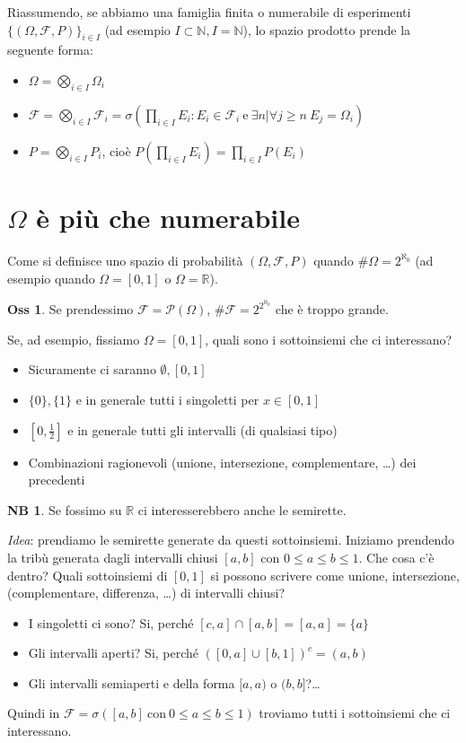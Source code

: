 \documentclass[12pt, a4paper]{report}
\theoremstyle{definition}
\newtheorem*{observation}{Oss}
\newtheorem*{note}{NB}
\DeclareRobustCommand{\F}{\mathcal{F}}%
\DeclareRobustCommand{\R}{\mathbb{R}}%
\DeclareRobustCommand{\N}{\mathbb{N}}%
\DeclareRobustCommand{\powerset}{\mathcal{P}(\Omega)}
\DeclareRobustCommand{\probspace}{(\Omega,\F,P)}
\begin{document}
Riassumendo, se abbiamo una famiglia finita o numerabile di esperimenti \(\{
\probspace\}_{i\in I}\) (ad esempio \(I\subset\N, I=\N\)), lo
spazio prodotto prende la seguente forma:
\begin{itemize}
	\item \(\Omega=\bigotimes_{i\in I}\Omega_i\)
	\item \(\F=\bigotimes_{i\in I}\F_i=\sigma(\prod_{i\in I}E_i:E_i\in\F_i\ 
	\text{e}\ \exists n|\forall j\geq n\ E_j=\Omega_i)\)
	\item \(P=\bigotimes_{i\in I}P_i\), cioè \(P(\prod_{i\in I}E_i)=
	\prod_{i\in I}P(E_i)\)
\end{itemize}
\section{$\Omega$ è più che numerabile}
Come si definisce uno spazio di probabilità $\probspace$ quando \(\#\Omega=
2^{\aleph_0}\) (ad esempio quando \(\Omega=[0,1]\) o \(\Omega=\R\)).

\begin{observation}
	Se prendessimo $\F=\powerset$, $\#\F=2^{2^{\aleph_0}}$ che è troppo grande.
\end{observation}

Se, ad esempio, fissiamo \(\Omega=[0,1]\), quali sono i sottoinsiemi che ci interessano?
\begin{itemize}
	\item Sicuramente ci saranno \(\emptyset, [0,1]\)
	\item \(\{0\}, \{1\}\) e in generale tutti i singoletti per \(x\in [0,1]\)
	\item \([0, \frac{1}{2}]\) e in generale tutti gli intervalli (di qualsiasi tipo)
	\item Combinazioni ragionevoli (unione, intersezione, complementare, \dots) dei
	precedenti
\end{itemize}
\begin{note}
	Se fossimo su $\R$ ci interesserebbero anche le semirette.
\end{note}

\emph{Idea}: prendiamo le semirette generate da questi sottoinsiemi.
Iniziamo prendendo la tribù generata dagli intervalli chiusi $[a,b]$ con
\(0\leq a\leq b\leq 1\). Che cosa c'è dentro? Quali sottoinsiemi di $[0,1]$ si
possono scrivere come unione, intersezione, (complementare, differenza, \dots) di
intervalli chiusi?
\begin{itemize}
	\item I singoletti ci sono? Si, perché \([c,a]\cap [a,b]=[a,a]=\{a\}\)
	\item Gli intervalli aperti? Si, perché \(([0,a]\cup[b,1])^c=(a,b)\)
	\item Gli intervalli semiaperti e della forma $[a,a)$ o $(b,b]$?\dots
\end{itemize}
Quindi in \(\F=\sigma([a,b]\ \text{con}\ 0\leq a\leq b\leq 1)\) troviamo tutti i
sottoinsiemi che ci interessano.
\end{document}
